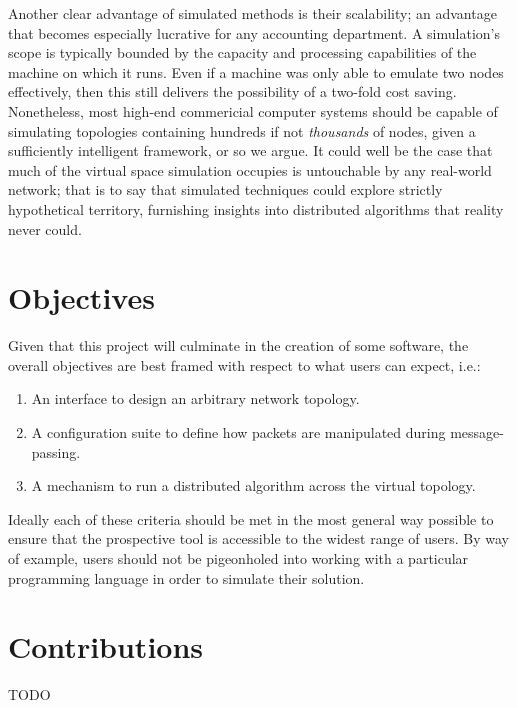 Another clear advantage of simulated methods is their scalability; an advantage that becomes especially lucrative for
any accounting department. A simulation's scope is typically bounded by the capacity and processing capabilities of
the machine on which it runs. Even if a machine was only able to emulate two nodes effectively, then this still
delivers the possibility of a two-fold cost saving. Nonetheless, most high-end commericial computer systems should be
capable of simulating topologies containing hundreds if not \emph{thousands} of nodes, given a sufficiently
intelligent framework, or so we argue. It could well be the case that much of the virtual space simulation occupies
is untouchable by any real-world network; that is to say that simulated techniques could explore strictly
hypothetical territory, furnishing insights into distributed algorithms that reality never could.


\section{Objectives}

Given that this project will culminate in the creation of some software, the overall objectives are best framed with
respect to what users can expect, i.e.:
\begin{enumerate}
    \item An interface to design an arbitrary network topology.
    \item A configuration suite to define how packets are manipulated during message-passing.
    \item A mechanism to run a distributed algorithm across the virtual topology.
\end{enumerate}

Ideally each of these criteria should be met in the most general way possible to ensure that the prospective tool is
accessible to the widest range of users. By way of example, users should not be pigeonholed into working with a
particular programming language in order to simulate their solution. 


\section{Contributions}

TODO
